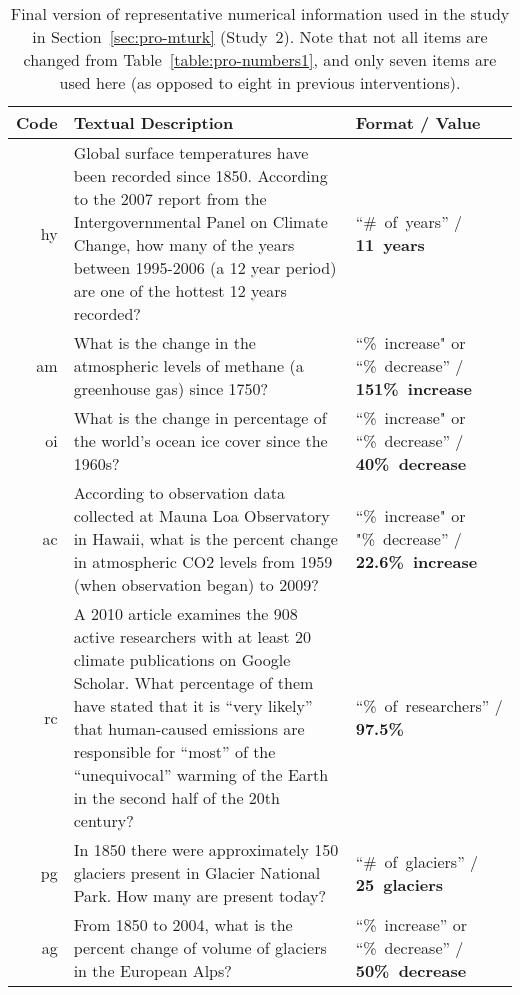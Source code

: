 \begin{table}
    \caption{Final version of representative numerical information used in the study in
        Section~\ref{sec:pro-mturk} (Study~2). Note that not all items are changed from
        Table~\ref{table:pro-numbers1}, and only seven items are used here (as
        opposed to eight in previous interventions).}
    \label{table:pro-numbers2}
    \begin{tabu}{>{\sffamily}rX[3]X[-1,l]}
        \toprule
        Code & Textual Description & Format / Value \\
        \midrule

hy &
Global surface temperatures have been recorded since 1850. According to the 2007
report from the Intergovernmental Panel on Climate Change, how many of the years
between 1995-2006 (a 12 year period) are one of the hottest 12 years recorded? &
“\#~of~years” /
\textbf{11~years} \\

am &
What is the change in the atmospheric levels of methane (a greenhouse gas) since
1750? &
“\%~increase" or “\%~decrease” /
\textbf{151\%~increase} \\

oi &
What is the change in percentage of the world's ocean ice cover since the 1960s?
&
“\%~increase" or “\%~decrease” /
\textbf{40\%~decrease} \\

ac &
According to observation data collected at Mauna Loa Observatory in Hawaii, what
is the percent change in atmospheric CO2 levels from 1959 (when observation
began) to 2009? &
“\%~increase" or "\%~decrease” /
\textbf{22.6\%~increase} \\

rc &
A 2010 article examines the 908 active researchers with at least 20 climate
publications on Google Scholar. What percentage of them have stated that it is
“very likely” that human-caused emissions are responsible for “most” of the
“unequivocal” warming of the Earth in the second half of the 20th century? &
“\%~of~researchers” /
\textbf{97.5\%} \\

pg &
In 1850 there were approximately 150 glaciers present in Glacier National Park.
How many are present today? &
“\#~of~glaciers” /
\textbf{25~glaciers} \\

ag &
From 1850 to 2004, what is the percent change of volume of glaciers in the
European Alps? &
“\%~increase” or “\%~decrease” /
\textbf{50\%~decrease} \\

\bottomrule
\end{tabu}
\end{table}
